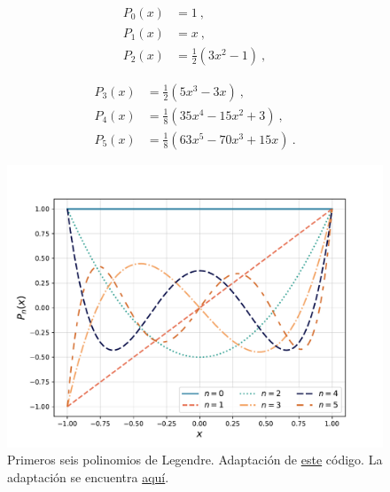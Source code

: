 \begin{minipage}[b]{.45\textwidth}
    \begin{align*}
        P_0(x) & = 1 \ , \phantom{\frac{1}{2}} \\
        P_1(x) & = x \ , \phantom{\frac{1}{2}} \\
        P_2(x) & = \frac{1}{2}(3x^2 - 1) \ ,
    \end{align*}
\end{minipage}
\hfill
\begin{minipage}[b]{.45\textwidth}
    \begin{align*}
        P_3(x) & = \frac{1}{2}(5x^3 - 3x) \ , \\
        P_4(x) & = \frac{1}{8}(35x^4 - 15x^2 + 3) \ , \\
        P_5(x) & = \frac{1}{8}(63x^5 - 70x^3 + 15x) \ . 
    \end{align*}
\end{minipage}

\begin{figure}[htbp]
    \centering
    \includegraphics[width=12cm]{./Figuras/Legendre-Polynomials.pdf}
    \caption{Primeros seis polinomios de Legendre. Adaptación de \href{https://github.com/gfrubi/FM2/blob/master/figuras-editables/fig-Legendre.py}{este} código. La adaptación se encuentra \href{https://github.com/Pedroga-cc/Fisica-Matematica-II/blob/main/Figuras/Plotter_Legendre.py}{aquí}.}
    \label{fig:Legendre}
\end{figure}

